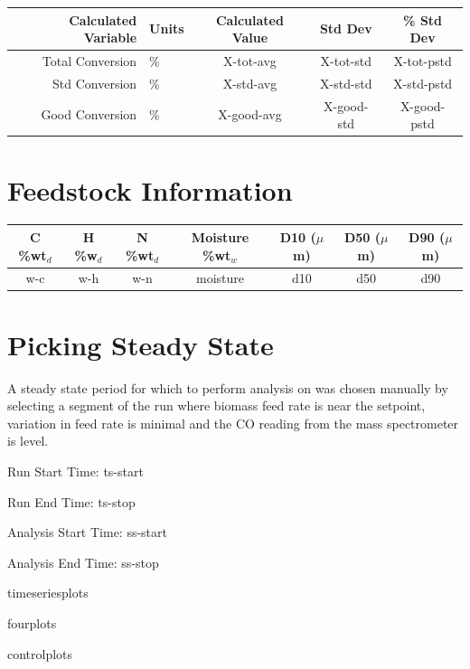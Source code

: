 \documentclass[11pt]{article}
\begin{document}
\begin{table}[hb]
\centering
\begin{tabular}{r l c c c}
	Calculated Variable	& Units		& Calculated Value		& Std Dev		& \% Std Dev	\\
\hline 	Total Conversion	& \%			& X-tot-avg			& X-tot-std		& X-tot-pstd		\\
	Std Conversion	& \%			& X-std-avg			& X-std-std		& X-std-pstd		\\
	Good Conversion	& \%			& X-good-avg		& X-good-std		& X-good-pstd	\\
\end{tabular}
\end{table}

\newpage

\vspace{-4ex}
\section*{Feedstock Information}
\vspace{-2ex}

\begin{table}[h]
\centering
\begin{tabular}{c c c c c c c}
	C \%wt$_{d}$	& H \%w$_{d}$	& N \%wt$_{d}$	& Moisture \%wt$_{w}$	& D10 ($\mu$m)	& D50 ($\mu$m)	& D90 ($\mu$m)	\\
\hline 	w-c			& w-h			& w-n			& moisture			& d10			& d50			& d90		\\
\end{tabular}
\end{table}


\section*{Picking Steady State}

A steady state period for which to perform analysis on was chosen manually by selecting a segment of the run where biomass feed rate is near the setpoint, variation in feed rate is minimal and the CO reading from the mass spectrometer is level.

Run Start Time: ts-start

Run End Time: ts-stop

Analysis Start Time: ss-start

Analysis End Time: ss-stop

\centering
\clearpage
timeseriesplots
\clearpage
\newpage

fourplots
\clearpage
\newpage

controlplots
\clearpage
\end{document}
